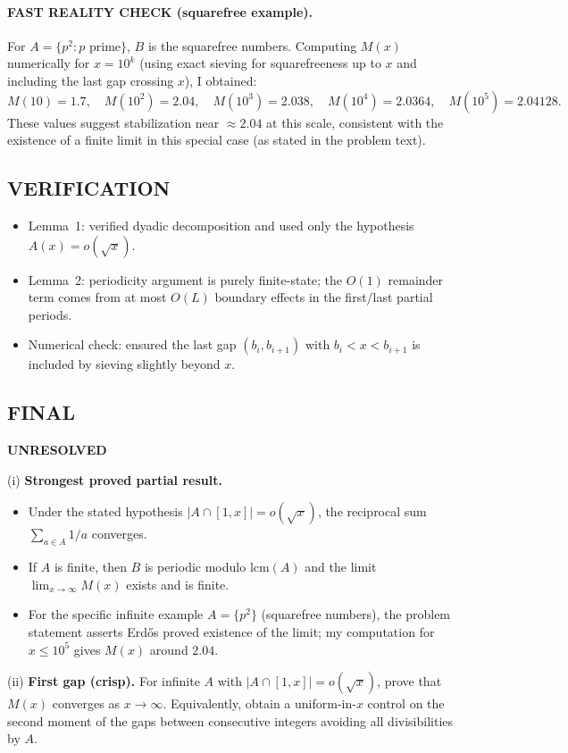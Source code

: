 \paragraph{FAST REALITY CHECK (squarefree example).}
For $A=\{p^2: p\text{ prime}\}$, $B$ is the squarefree numbers.
Computing $M(x)$ numerically for $x=10^k$ (using exact sieving for squarefreeness up to $x$ and including the last gap crossing $x$), I obtained:
\[
M(10)=1.7,\quad
M(10^2)=2.04,\quad
M(10^3)=2.038,\quad
M(10^4)=2.0364,\quad
M(10^5)=2.04128.
\]
These values suggest stabilization near $\approx 2.04$ at this scale, consistent with the existence of a finite limit in this special case (as stated in the problem text).

\subsection*{VERIFICATION}
\begin{itemize}
\item Lemma~1: verified dyadic decomposition and used only the hypothesis $A(x)=o(\sqrt x)$.
\item Lemma~2: periodicity argument is purely finite-state; the $O(1)$ remainder term comes from at most $O(L)$ boundary effects in the first/last partial periods.
\item Numerical check: ensured the last gap $(b_i,b_{i+1})$ with $b_i<x<b_{i+1}$ is included by sieving slightly beyond $x$.
\end{itemize}

\subsection*{FINAL}
\textbf{UNRESOLVED}

(i) \textbf{Strongest proved partial result.}
\begin{itemize}
\item Under the stated hypothesis $|A\cap[1,x]|=o(\sqrt x)$, the reciprocal sum $\sum_{a\in A}1/a$ converges.
\item If $A$ is finite, then $B$ is periodic modulo $\mathrm{lcm}(A)$ and the limit $\lim_{x\to\infty}M(x)$ exists and is finite.
\item For the specific infinite example $A=\{p^2\}$ (squarefree numbers), the problem statement asserts Erd\H{o}s proved existence of the limit; my computation for $x\le 10^5$ gives $M(x)$ around $2.04$.
\end{itemize}

(ii) \textbf{First gap (crisp).} For infinite $A$ with $|A\cap[1,x]|=o(\sqrt x)$, prove that $M(x)$ converges as $x\to\infty$.
Equivalently, obtain a uniform-in-$x$ control on the second moment of the gaps between consecutive integers avoiding all divisibilities by $A$.

